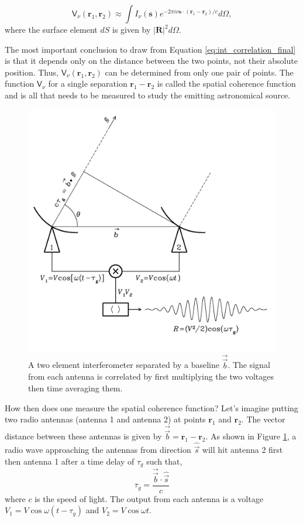 \begin{equation}
\label{eq:int_correlation_final}
\mathsf{V}_\nu (\mathbf{r}_1, \mathbf{r}_2) \approx \int I_\nu(\mathbf{s}) e^{-2 \pi i \nu\mathbf{s} \cdot (\mathbf{r}_1 - \mathbf{r}_2)/c} d\Omega,
\end{equation}
where the surface element $dS$ is given by $\vert \mathbf{R} \vert ^2 d\Omega$.

The most important conclusion to draw from Equation \ref{eq:int_correlation_final} is that it depends only on the distance between the two points, not their absolute position. Thus, $\mathsf{V}_\nu (\mathbf{r}_1, \mathbf{r}_2)$ can be determined from only one pair of points. The function $\mathsf{V}_\nu$ for a single separation $\mathbf{r}_1 - \mathbf{r}_2$ is called the spatial coherence function and is all that needs to be measured to study the emitting astronomical source.

\begin{figure}[ht]
    \centering
    \includegraphics[width=0.75\columnwidth]{Images/2_elem_int.png}
    \caption[A two element interferometer.]{A two element interferometer separated by a baseline $\overrightarrow{\Vec{b}}$. The signal from each antenna is correlated by first multiplying the two voltages then time averaging them.}
    \label{fig:2_el_int}
\end{figure}

How then does one measure the spatial coherence function? Let's imagine putting two radio antennas (antenna 1 and antenna 2) at points $\mathbf{r}_1$ and $\mathbf{r}_2$. The vector distance between these antennas is given by $\overrightarrow{\Vec{b}} = \mathbf{r}_1 - \mathbf{r}_2$. As shown in Figure \ref{fig:2_el_int}, a radio wave approaching the antennas from direction $\hat{\Vec{s}}$  will hit antenna 2 first then antenna 1 after a time delay of $\tau_g$ such that,
\begin{equation}
\label{eq:time_delay}
\tau_g = \frac{\overrightarrow{\Vec{b}} \cdot \hat{\Vec{s}}}{c}
\end{equation}
where $c$ is the speed of light. The output from each antenna is a voltage $V_1 = V \cos{\omega(t - \tau_g)}$ and $V_2 = V\cos{\omega t}$. 


